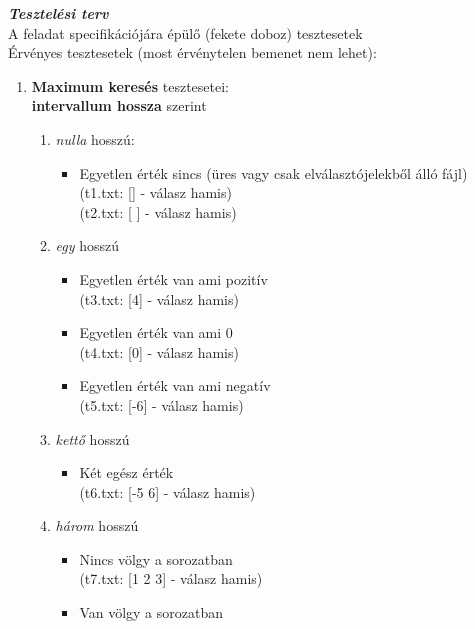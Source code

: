 \documentclass[12pt,a4paper]{article}			%
\newcommand{\fejezet}[1]{\noindent \textbf{\textit{\large #1 \vspace{5mm}}}}
\begin{document}
	\fejezet{Tesztelési terv}\\
		\renewcommand{\labelenumi}{\Alph{enumi}.}
		\renewcommand{\labelenumii}{\arabic{enumii}.}
		{\large A feladat specifikációjára épülő (fekete doboz) tesztesetek} \vspace{2mm}\\
		Érvényes tesztesetek (most érvénytelen bemenet nem lehet):
		\begin{enumerate}		
			\item \textbf{Maximum keresés} tesztesetei:\\
			\textbf{intervallum hossza} szerint
			\begin{enumerate}
				\item \textit{nulla} hosszú: 
				\begin{itemize}[label={}]
					\item Egyetlen érték sincs (üres vagy csak elválasztójelekből álló fájl)\\
					(t1.txt: [] - válasz hamis)\\
					(t2.txt: [    ] - válasz hamis)
				\end{itemize}
				\item \textit{egy} hosszú
				\begin{itemize}[label={}]
					\item Egyetlen érték van ami pozitív\\
					(t3.txt: [4] - válasz hamis)
					\item Egyetlen érték van ami 0\\
					(t4.txt: [0] - válasz hamis)
					\item Egyetlen érték van ami negatív\\
					(t5.txt: [-6] - válasz hamis)
				\end{itemize}
				\item \textit{kettő} hosszú
				\begin{itemize}[label={}]
					\item Két egész érték\\
					(t6.txt: [-5 6] - válasz hamis)
				\end{itemize}
				\item \textit{három} hosszú
				\begin{itemize}[label={}]
					\item Nincs völgy a sorozatban\\
					(t7.txt: [1 2 3] - válasz hamis)
					\item Van völgy a sorozatban\\

\end{itemize}
\end{enumerate}
\end{enumerate}
\end{document}
